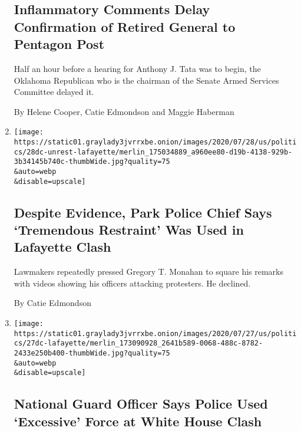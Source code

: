 \begin{enumerate}
{  \subsection{Inflammatory Comments Delay Confirmation of Retired
  General to Pentagon
  Post}\label{inflammatory-comments-delay-confirmation-of-retired-general-to-pentagon-post}}

  Half an hour before a hearing for Anthony J. Tata was to begin, the
  Oklahoma Republican who is the chairman of the Senate Armed Services
  Committee delayed it.

  By Helene Cooper, Catie Edmondson and Maggie Haberman
\item
  \href{/2020/07/28/us/politics/lafayette-square-park-police-protests.html}{}

  \texttt{[image: https://static01.graylady3jvrrxbe.onion/images/2020/07/28/us/politics/28dc-unrest-lafayette/merlin\_175034889\_a960ee80-d19b-4138-929b-3b34145b740c-thumbWide.jpg?quality=75\\\&auto=webp\\\&disable=upscale]}

  \hypertarget{despite-evidence-park-police-chief-says-tremendous-restraint-was-used-in-lafayette-clash}{%
  \subsection{Despite Evidence, Park Police Chief Says `Tremendous
  Restraint' Was Used in Lafayette
  Clash}\label{despite-evidence-park-police-chief-says-tremendous-restraint-was-used-in-lafayette-clash}}

  Lawmakers repeatedly pressed Gregory T. Monahan to square his remarks
  with videos showing his officers attacking protesters. He declined.

  By Catie Edmondson
\item
  \href{/2020/07/27/us/politics/national-guard-excessive-force-lafayette-square.html}{}

  \texttt{[image: https://static01.graylady3jvrrxbe.onion/images/2020/07/27/us/politics/27dc-lafayette/merlin\_173090928\_2641b589-0068-488c-8782-2433e250b400-thumbWide.jpg?quality=75\\\&auto=webp\\\&disable=upscale]}

  \hypertarget{national-guard-officer-says-police-used-excessive-force-at-white-house-clash}{%
  \subsection{National Guard Officer Says Police Used `Excessive' Force
  at White House
  Clash}\label{national-guard-officer-says-police-used-excessive-force-at-white-house-clash}}


\end{enumerate}
